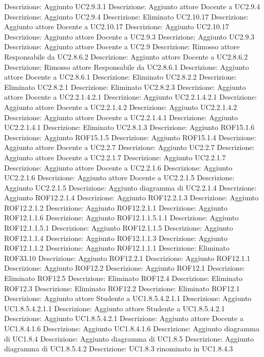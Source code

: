 Descrizione: Aggiunto UC2.9.3.1 
Descrizione: Aggiunto attore Docente a UC2.9.4 
Descrizione: Aggiunto UC2.9.4 
Descrizione: Eliminato UC2.10.17 
Descrizione: Aggiunto attore Docente a UC2.10.17 
Descrizione: Aggiunto UC2.10.17 
Descrizione: Aggiunto attore Docente a UC2.9.3 
Descrizione: Aggiunto UC2.9.3 
Descrizione: Aggiunto attore Docente a UC2.9 
Descrizione: Rimosso attore Responsabile da UC2.8.6.2 
Descrizione: Aggiunto attore Docente a UC2.8.6.2 
Descrizione: Rimosso attore Responsabile da UC2.8.6.1 
Descrizione: Aggiunto attore Docente a UC2.8.6.1 
Descrizione: Eliminato UC2.8.2.2 
Descrizione: Eliminato UC2.8.2.1 
Descrizione: Eliminato UC2.8.2.3 
Descrizione: Aggiunto attore Docente a UC2.2.1.4.2.1 
Descrizione: Aggiunto UC2.2.1.4.2.1 
Descrizione: Aggiunto attore Docente a UC2.2.1.4.2 
Descrizione: Aggiunto UC2.2.1.4.2 
Descrizione: Aggiunto attore Docente a UC2.2.1.4.1 
Descrizione: Aggiunto UC2.2.1.4.1 
Descrizione: Eliminato UC2.8.1.3 
Descrizione: Aggiunto ROF15.1.6 
Descrizione: Aggiunto ROF15.1.5 
Descrizione: Aggiunto ROF15.1.4 
Descrizione: Aggiunto attore Docente a UC2.2.7 
Descrizione: Aggiunto UC2.2.7 
Descrizione: Aggiunto attore Docente a UC2.2.1.7 
Descrizione: Aggiunto UC2.2.1.7 
Descrizione: Aggiunto attore Docente a UC2.2.1.6 
Descrizione: Aggiunto UC2.2.1.6 
Descrizione: Aggiunto attore Docente a UC2.2.1.5 
Descrizione: Aggiunto UC2.2.1.5 
Descrizione: Aggiunto diagramma di UC2.2.1.4 
Descrizione: Aggiunto ROF12.2.1.4 
Descrizione: Aggiunto ROF12.2.1.3 
Descrizione: Aggiunto ROF12.2.1.2 
Descrizione: Aggiunto ROF12.2.1.1 
Descrizione: Aggiunto ROF12.1.1.6 
Descrizione: Aggiunto ROF12.1.1.5.1.1 
Descrizione: Aggiunto ROF12.1.1.5.1 
Descrizione: Aggiunto ROF12.1.1.5 
Descrizione: Aggiunto ROF12.1.1.4 
Descrizione: Aggiunto ROF12.1.1.3 
Descrizione: Aggiunto ROF12.1.1.2 
Descrizione: Aggiunto ROF12.1.1.1 
Descrizione: Eliminato ROF33.10 
Descrizione: Aggiunto ROF12.2.1 
Descrizione: Aggiunto ROF12.1.1 
Descrizione: Aggiunto ROF12.2 
Descrizione: Aggiunto ROF12.1 
Descrizione: Eliminato ROF12.5 
Descrizione: Eliminato ROF12.4 
Descrizione: Eliminato ROF12.3 
Descrizione: Eliminato ROF12.2 
Descrizione: Eliminato ROF12.1 
Descrizione: Aggiunto attore Studente a UC1.8.5.4.2.1.1 
Descrizione: Aggiunto UC1.8.5.4.2.1.1 
Descrizione: Aggiunto attore Studente a UC1.8.5.4.2.1 
Descrizione: Aggiunto UC1.8.5.4.2.1 
Descrizione: Aggiunto attore Docente a UC1.8.4.1.6 
Descrizione: Aggiunto UC1.8.4.1.6 
Descrizione: Aggiunto diagramma di UC1.8.4 
Descrizione: Aggiunto diagramma di UC1.8.5 
Descrizione: Aggiunto diagramma di UC1.8.5.4.2 
Descrizione: UC1.8.3 rinominato in UC1.8.4.3 

